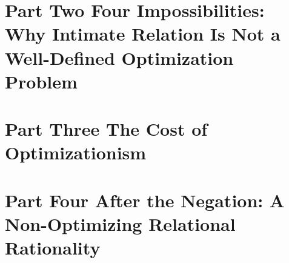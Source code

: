 \documentclass[11pt,a4paper]{article}
\begin{document}

\part*{\textcolor{rosedeep}{Part Two \quad Four Impossibilities: Why Intimate Relation Is Not a Well-Defined Optimization Problem}}


\part*{\textcolor{rosedeep}{Part Three \quad The Cost of Optimizationism}}


\part*{\textcolor{rosedeep}{Part Four \quad After the Negation: A Non-Optimizing Relational Rationality}}
\end{document}

